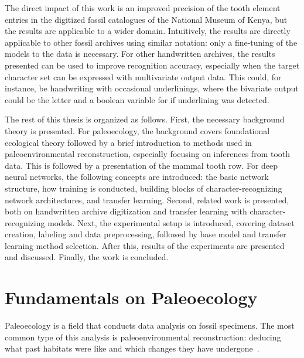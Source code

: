 \documentclass[english,twoside,openright]{UH_DS_MSc}
\begin{document}
The direct impact of this work is an improved precision of the tooth element entries in the digitized 
fossil catalogues of the National Museum of Kenya, but the results are applicable to a wider domain.
Intuitively, the results are directly applicable to other fossil archives using similar notation: only a fine-tuning of the 
models to the data is necessary.
For other handwritten archives, the results presented can be used to improve recognition accuracy, especially when the target character set can be expressed with multivariate output data. This could, for 
instance, be handwriting with occasional underlinings, where the bivariate output could be the letter and a boolean variable for if underlining was detected.

The rest of this thesis is organized as follows. First, the necessary background theory is 
presented. For paleoecology, the background covers 
foundational ecological theory followed by a brief introduction to methods used in
paleoenvironmental reconstruction, especially focusing on inferences from tooth data. This is
followed by a presentation of the mammal tooth row.
For deep neural networks, the following concepts are introduced:
the basic network structure, how training is conducted, building blocks of character-recognizing network architectures, and transfer learning. 
Second, related work is presented, both on
handwritten archive digitization and transfer learning with character-recognizing models.
Next, the experimental setup is introduced, covering dataset creation, labeling and data 
preprocessing, followed by base model and transfer learning method selection. After this, 
results of the experiments are presented and discussed. Finally, the work is concluded.

\chapter{Fundamentals on Paleoecology}

Paleoecology is a field that conducts data analysis on fossil specimens. The most common type of 
this analysis is paleoenvironmental reconstruction: deducing what past habitats were like and which 
changes they have undergone~\cite{Faith_Lyman_2019_ch2}.
\end{document}
